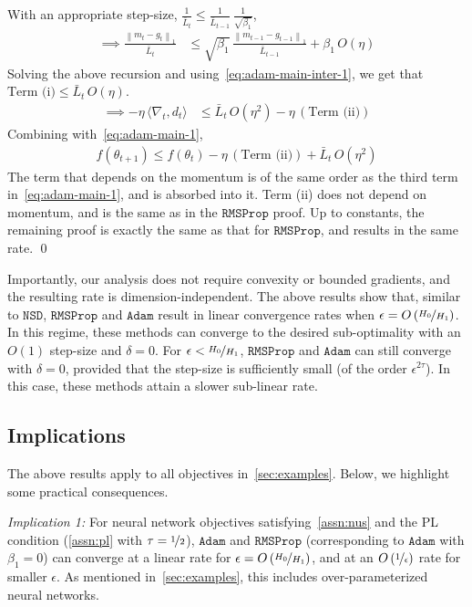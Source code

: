 \documentclass{article}
\newcommand{\norm}[1]{\left\|#1 \right\|}
\newcommand{\tht}{\theta_t}
\newcommand{\thtt}{\theta_{t+1}}
\newcommand{\NSD}{\texttt{NSD}}
\newcommand{\RMS}{\texttt{RMSProp}}
\newcommand{\Adam}{\texttt{Adam}}
\begin{document}
With an appropriate step-size, $\frac{1}{\bar{L}_t} \leq \frac{1}{\bar{L}_{t-1}} \, \frac{1}{\sqrt{\beta_1}}$, 
\begin{align}
\implies \frac{\norm{m_t - g_t}_1}{\bar{L}_t} & \leq \sqrt{\beta_1} \, \frac{\norm{m_{t-1} - g_{t-1}}_1}{\bar{L}_{t-1}} + \beta_1 \, O(\eta) \nonumber
\end{align}
Solving the above recursion and using~\cref{eq:adam-main-inter-1}, we get that $\text{Term (i)} \leq \bar{L}_t \, O(\eta)$.
\begin{align}
\implies - \eta \, \langle \nabla_t, d_t \rangle & \leq \bar{L}_t \, O(\eta^2) - \eta \, (\text{Term (ii)}) \nonumber
\end{align}
Combining with~\cref{eq:adam-main-1}, 
\begin{align}
f(\thtt) \leq f(\tht)  - \eta \, (\text{Term (ii)}) +  \bar{L}_t \, O(\eta^2) \nonumber
\end{align}
The term that depends on the momentum is of the same order as the third term in~\cref{eq:adam-main-1}, and is absorbed into it. Term (ii) does not depend on momentum, and is the same as in the $\RMS$ proof. Up to constants, the remaining proof is exactly the same as that for $\RMS$, and results in the same rate. \qed

Importantly, our analysis does not require convexity or bounded gradients, and the resulting rate is dimension-independent. The above results show that, similar to $\NSD$, $\RMS$ and $\Adam$ result in linear convergence rates when $\epsilon = O\left(\nicefrac{H_0}{H_1}\right)$. In this regime, these methods can converge to the desired sub-optimality with an $O(1)$ step-size and $\delta = 0$. For $\epsilon < \nicefrac{H_0}{H_1}$, $\RMS$ and $\Adam$ can still converge with $\delta = 0$, provided that the step-size is sufficiently small (of the order $\epsilon^{2 \tau}$). In this case, these methods attain a slower sub-linear rate. 

\subsection{Implications}
\label{sec:adaptive-implications}
The above results apply to all objectives in~\cref{sec:examples}. Below, we highlight some practical consequences. 

\textit{Implication 1:} For neural network objectives satisfying~\cref{assn:nus} and the PL condition (\cref{assn:pl} with $\tau = \nicefrac{1}{2}$), $\Adam$ 
and $\RMS$ (corresponding to $\Adam$ with $\beta_1 = 0$) can converge at a linear rate for $\epsilon = O\left(\nicefrac{H_0}{H_1}\right)$, and at an $O\left(\nicefrac{1}{\epsilon}\right)$ rate for smaller $\epsilon$. As mentioned in~\cref{sec:examples}, this includes over-parameterized neural networks. 
\end{document}

